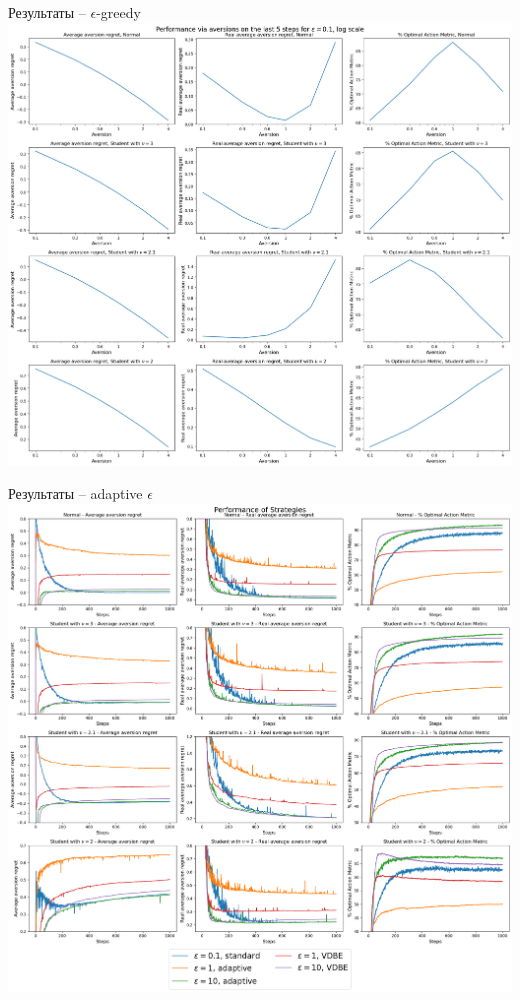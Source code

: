 \documentclass[11pt]{beamer} %
\begin{document}
    \begin{frame}{Результаты -- $\epsilon$-greedy}
        \includegraphics[scale=0.13,center]{images/theory_images/epsilon_greedy/avers_last.png}
    \end{frame}
    \begin{frame}{Результаты -- adaptive $\epsilon$}
        \includegraphics[scale=0.13,center]{images/theory_images/adaptive_epsilon/one_distr.png}
    \end{frame}
\end{document}
